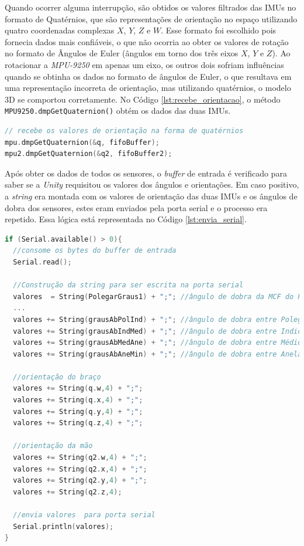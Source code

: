 Quando ocorrer alguma interrupção, são obtidos os valores filtrados das \ac{IMU}s no formato de Quatérnios, que são representações de orientação no espaço utilizando quatro coordenadas complexas $X$, $Y$, $Z$ e $W$. Esse formato foi escolhido pois fornecia dados mais confiáveis, o que não ocorria ao obter os valores de rotação no formato de Ângulos de Euler (ângulos em torno dos três eixos $X$, $Y$ e $Z$). Ao rotacionar a \textit{MPU-9250} em apenas um eixo, os outros dois sofriam influências quando se obtinha os dados no formato de ângulos de Euler, o que resultava em uma representação incorreta de orientação, mas utilizando quatérnios, o modelo \ac{3D} se comportou corretamente. No Código \ref{lst:recebe_orientacao}, o método \lstinline!MPU9250.dmpGetQuaternion()! obtém os dados das duas \ac{IMU}s.

\begin{lstlisting}[language=C++,label=lst:recebe_orientacao,caption={Leitura das \textit{IMUs}},morekeywords={ResponsiveAnalogRead,MPU9250,delay,Serial,begin,println,print,attachInterrupt,pinMode}]
// recebe os valores de orientação na forma de quatérnios
mpu.dmpGetQuaternion(&q, fifoBuffer);
mpu2.dmpGetQuaternion(&q2, fifoBuffer2);
\end{lstlisting}

Após obter os dados de todos os sensores, o \textit{buffer} de entrada é verificado para saber se a \textit{Unity} requisitou os valores dos ângulos e orientações. Em caso positivo, a \textit{string} era montada com os valores de orientação das duas \ac{IMU}s e os ângulos de dobra dos sensores, estes eram enviados pela porta serial e o processo era repetido. Essa lógica está representada no Código \ref{lst:envia_serial}.

\begin{lstlisting}[language=C++,label=lst:envia_serial,caption={Envio dos dados pela porta serial},morekeywords={ResponsiveAnalogRead,MPU9250,delay,Serial,begin,println,print,attachInterrupt,pinMode}]
if (Serial.available() > 0){
  //consome os bytes do buffer de entrada
  Serial.read();
  
  //Construção da string para ser escrita na porta serial
  valores  = String(PolegarGraus1) + ";"; //ângulo de dobra da MCF do Polegar
  ...
  valores += String(grausAbPolInd) + ";"; //ângulo de dobra entre Polegar e Indicador
  valores += String(grausAbIndMed) + ";"; //ângulo de dobra entre Indicador e Médio
  valores += String(grausAbMedAne) + ";"; //ângulo de dobra entre Médio e Anelar
  valores += String(grausAbAneMin) + ";"; //ângulo de dobra entre Anelar e Mínimo
  
  //orientação do braço
  valores += String(q.w,4) + ";";
  valores += String(q.x,4) + ";";
  valores += String(q.y,4) + ";";
  valores += String(q.z,4) + ";";
  
  //orientação da mão
  valores += String(q2.w,4) + ";";
  valores += String(q2.x,4) + ";";
  valores += String(q2.y,4) + ";";
  valores += String(q2.z,4);
  
  //envia valores  para porta serial
  Serial.println(valores);
}
\end{lstlisting}

